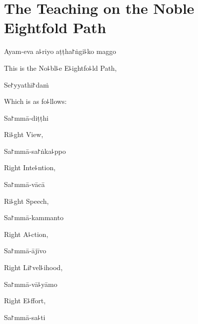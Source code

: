 
\chapter[The Noble Eightfold Path]{The Teaching on the Noble Eightfold Path}%


\begin{leader}
\end{leader}

Ayam-eva a꜕riyo aṭṭha꜓ṅgi꜕ko maggo

\begin{english}
  This is the No꜕bl꜕e E꜕ightfo꜕ld Path,
\end{english}

Se꜓yyathī꜓daṁ

\begin{english}
  Which is as fo꜕llows:
\end{english}

Sa꜓mmā-diṭṭhi

\begin{english}
  Ri꜕ght View,
\end{english}

Sa꜓mmā-sa꜓ṅka꜕ppo

\begin{english}
  Right Inte꜕ntion,
\end{english}

Sa꜓mmā-vācā

\begin{english}
  Ri꜕ght Speech,
\end{english}

Sa꜓mmā-kammanto

\begin{english}
  Right A꜕ction,
\end{english}

Sa꜓mmā-ājīvo

\begin{english}
  Right Li꜓vel꜕ihood,
\end{english}

Sa꜓mmā-vā꜕yāmo

\begin{english}
  Right E꜕ffort,
\end{english}

\ifaivedition
\clearpage
\fi

Sa꜓mmā-sa꜕ti

